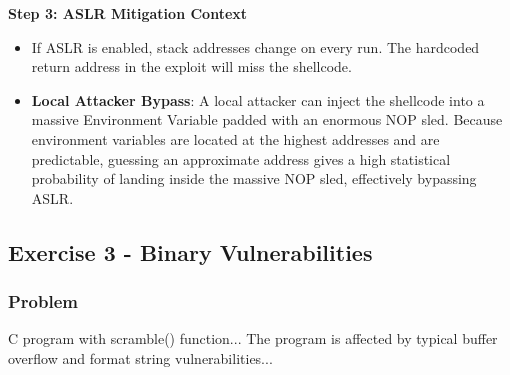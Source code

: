 \documentclass{article}
\begin{document}
\textbf{Step 3: ASLR Mitigation Context}
\begin{itemize}
    \item If ASLR is enabled, stack addresses change on every run. The hardcoded return address in the exploit will miss the shellcode.
    \item \textbf{Local Attacker Bypass}: A local attacker can inject the shellcode into a massive Environment Variable padded with an enormous NOP sled. Because environment variables are located at the highest addresses and are predictable, guessing an approximate address gives a high statistical probability of landing inside the massive NOP sled, effectively bypassing ASLR.
\end{itemize}

\subsection{Exercise 3 - Binary Vulnerabilities}
\subsubsection*{Problem}
C program with scramble() function... The program is affected by typical buffer overflow and format string vulnerabilities...
\end{document}
